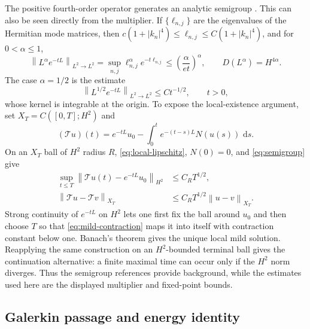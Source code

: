 \documentclass[11pt]{article}
\numberwithin{equation}{section}
\theoremstyle{definition}
\newcommand{\dd}{\,\mathrm d}
\newcommand{\norm}[1]{\left\lVert#1\right\rVert}
\begin{document}
The positive fourth-order operator generates an analytic semigroup
\cite{Pazy,Amann}.  This can also be seen directly from the multiplier.  If
$\{\ell_{n,j}\}$ are the eigenvalues of the Hermitian mode matrices, then
$c(1+|k_n|^4)\le\ell_{n,j}\le C(1+|k_n|^4)$, and for $0<\alpha\le1$,
\begin{equation}
 \norm{L^\alpha e^{-tL}}_{L^2\to L^2}
 =\sup_{n,j}\ell_{n,j}^{\alpha}e^{-t\ell_{n,j}}
 \le\left(\frac{\alpha}{e t}\right)^\alpha,
 \qquad D(L^\alpha)=H^{4\alpha}.
 \label{eq:semigroup-fractional}
\end{equation}
The case $\alpha=1/2$ is the estimate
\begin{equation}
 \norm{L^{1/2}e^{-tL}}_{L^2\to L^2}\le Ct^{-1/2},
 \qquad t>0,
 \label{eq:semigroup}
\end{equation}
whose kernel is integrable at the origin.  To expose the local-existence
argument, set $X_T=C([0,T];H^2)$ and
\begin{equation}
 (\mathcal Tu)(t)=e^{-tL}u_0-
 \int_0^t e^{-(t-s)L}N(u(s))\,\dd s .
 \label{eq:mild-fixed-point}
\end{equation}
On an $X_T$ ball of $H^2$ radius $R$, \eqref{eq:local-lipschitz},
$N(0)=0$, and \eqref{eq:semigroup} give
\begin{equation}
 \begin{aligned}
 \sup_{t\le T}\norm{\mathcal Tu(t)-e^{-tL}u_0}_{H^2}
   &\le C_R T^{1/2},\\
 \norm{\mathcal Tu-\mathcal Tv}_{X_T}
   &\le C_R T^{1/2}\norm{u-v}_{X_T}.
 \end{aligned}
 \label{eq:mild-contraction}
\end{equation}
Strong continuity of $e^{-tL}$ on $H^2$ lets one first fix the ball around
$u_0$ and then choose $T$ so that \eqref{eq:mild-contraction} maps it into
itself with contraction constant below one.  Banach's theorem gives the unique
local mild solution.  Reapplying the same construction on an $H^2$-bounded
terminal ball gives the continuation alternative: a finite maximal time can
occur only if the $H^2$ norm diverges.  Thus the semigroup references
\cite{Pazy,Amann} provide background, while the estimates used here are the
displayed multiplier and fixed-point bounds.

\subsection{Galerkin passage and energy identity}
\end{document}
